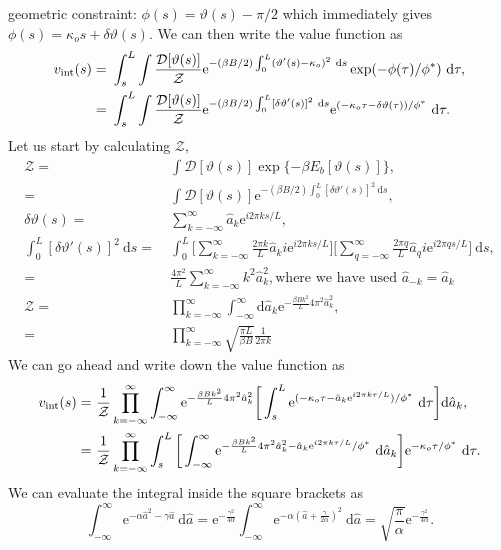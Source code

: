 \documentclass[%
reprint,
superscriptaddress,
floatfix,
amsmath,
amssymb,
aps,
notitlepage
]{revtex4-1}
\def\d{\text{d}}
\def\e{\text{e}}
\def\D{\mathcal{D}}
\def\Z{\mathcal{Z}}
\def\ah{\hat{a}}
\def\theta{\vartheta}
\begin{document}
geometric constraint: $\phi(s) = \theta(s) - \pi/2$ which immediately gives $\phi(s) = \kappa_o s + \delta \theta(s)$.
We can then write the value function as
\begin{align}
    v_{\rm int}(s) =& \ \int_{s}^L \int \frac{ \D[\theta(s)]}{\mathcal{Z}}\e^{-(\beta B/2) \int_0^L (\theta'(s)-\kappa_o)^2 \ \d s} \exp(-\phi(\tau)/\phi^*) \ \d \tau, \\
    =& \ \int_{s}^L \int \frac{ \D[\theta(s)]}{\mathcal{Z}}\e^{-(\beta B/2) \int_0^L [\delta \theta'(s)]^2 \ \d s} \e^{(-\kappa_o \tau - \delta \theta(\tau))/\phi^*} \ \d \tau.
\end{align}
Let us start by calculating $\Z$,
\begin{align}
    \Z =& \ \int \mathcal{D}[\theta(s)] \exp\{ {-\beta E_b[\theta(s)]} \}, \\
    =& \ \int \mathcal{D}[\theta(s)] \e^{-(\beta B/2) \int_0^L [\delta \theta'(s)]^2 \ \d s}, \\
    \delta \theta(s) =& \ \sum_{k=-\infty}^\infty \ah_k \e^{i 2 \pi k s/L}, \\
    \int_0^L [\delta \theta'(s)]^2 \ \d s =& \ \int_0^L \bigg[ \sum_{k=-\infty}^\infty \frac{2\pi k}{L} \ah_k i \e^{i 2 \pi k s/L} \bigg]
    \bigg[ \sum_{q=-\infty}^\infty \frac{2\pi q}{L} \ah_q i \e^{i 2 \pi q s/L} \bigg] \ \d s, \\
    =& \ \frac{4\pi^2}{L} \sum_{k=-\infty}^\infty k^2 \ah_k^2, \text{where we have used } \ah_{-k} = \ah_k \\
    \Z =& \ \prod_{k=-\infty}^\infty \int_{-\infty}^{\infty} \d \ah_k \e^{-\frac{\beta B k^2}{L} 4\pi^2\ah_k^2}, \\
    =& \ \prod_{k=-\infty}^\infty \sqrt{\frac{\pi L}{\beta B}} \frac{1}{2\pi k}
\end{align}
We can go ahead and write down the value function as
\begin{align}
    v_{\rm int}(s) =& \ \frac{1}{\Z} \prod_{k=-\infty}^\infty \int_{-\infty}^{\infty} \e^{-\frac{\beta B k^2}{L} 4\pi^2 \ah_k^2} \bigg[ \int_{s}^L \e^{(-\kappa_o \tau - \ah_k \e^{i 2 \pi k \tau/L})/\phi^*} \ \d \tau \bigg] \d \ah_k, \\
    =& \ \frac{1}{\Z} \prod_{k=-\infty}^\infty \int_{s}^L \bigg[ \int_{-\infty}^{\infty} \e^{-\frac{\beta B k^2}{L} 4\pi^2 \ah_k^2  - \ah_k \e^{i 2 \pi k \tau/L}/\phi^*} \ \d \ah_k \bigg]  \e^{-\kappa_o \tau/\phi^*} \ \d \tau.
\end{align}
We can evaluate the integral inside the square brackets as
\[
    \int_{-\infty}^\infty \e^{-\alpha \ah^2 -\gamma \ah} \ \d \ah = \e^{-\frac{\gamma^2}{4\alpha}}\int_{-\infty}^\infty \e^{-\alpha(\ah + \frac{\gamma}{2 \alpha})^2} \ \d \ah
    = \sqrt{\frac{\pi}{\alpha}} \e^{-\frac{\gamma^2}{4\alpha}}.
\]
\end{document}
